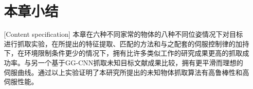 \documentclass[fontset=fandol,type=bachelor,campus=harbin,bsmainpagenumberline=true]{hithesisbook}
\begin{document}
\section{本章小结}[Content specification]
本章在六种不同家常的物体的八种不同位姿情况下对目标进行抓取实验，在所提出的特征提取、匹配的方法和与之配套的伺服控制律的加持下，在环境限制条件更少的情况下，拥有比许多类似工作的研究成果更高的抓取成功率。与另一个基于GG-CNN抓取未知目标文献成果比较，拥有更平滑而理想的伺服曲线。通过以上实验证明了本研究所提出的未知物体抓取算法有高鲁棒性和高伺服性能。
%

\backmatter

%

\end{document}
